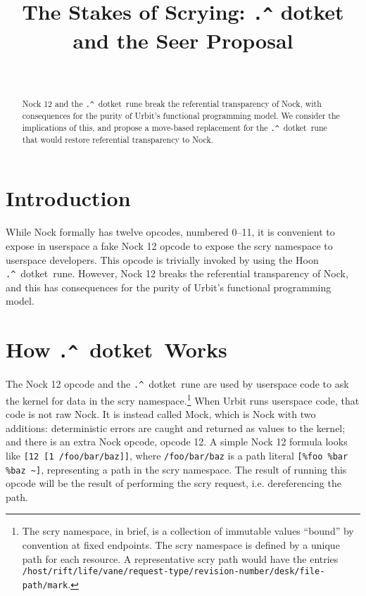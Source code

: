 \documentclass[twoside]{article}
\title{The Stakes of Scrying:  \lstinline[style=inlinecode]{.^} dotket and the Seer Proposal}
\author{\authorname~\authorpatp \\ \affiliation}
\date{}
\newcommand{\dotket}{\lstinline[style=inlinecode]{.^}~dotket}
\begin{document}
\maketitle
\thispagestyle{firststyle}

\begin{abstract}
Nock 12 and the \dotket~rune break the referential transparency of Nock, with consequences for the purity of Urbit's functional programming model.  We consider the implications of this, and propose a move-based replacement for the \dotket~rune that would restore referential transparency to Nock.
\end{abstract}

\setcounter{page}{1}

\tableofcontents

\section{Introduction}

While Nock formally has twelve opcodes, numbered 0--11, it is convenient to expose in userspace a fake Nock 12 opcode to expose the scry namespace to userspace developers.  This opcode is trivially invoked by using the Hoon \dotket~rune.  However, Nock 12 breaks the referential transparency of Nock, and this has consequences for the purity of Urbit's functional programming model.

\section[How dotket Works]{How \dotket~Works}

The Nock 12 opcode and the \dotket~rune are used by userspace code to ask the kernel for data in the scry namespace.\footnote{The scry namespace, in brief, is a collection of immutable values “bound” by convention at fixed endpoints.  The scry namespace is defined by a unique path for each resource.  A representative scry path would have the entries \lstinline[style=inlinecode]{/host/rift/life/vane/request-type/revision-number/desk/file-path/mark}.}  When Urbit runs userspace code, that code is not raw Nock.  It is instead called Mock, which is Nock with two additions:   deterministic errors are caught and returned as values to the kernel; and there is an extra Nock opcode, opcode 12.  A simple Nock 12 formula looks like \lstinline[style=inlinecode]{[12 [1 /foo/bar/baz]]}, where \lstinline[style=inlinecode]{/foo/bar/baz} is a path literal \lstinline[style=inlinecode]{[%foo %bar %baz ~]}, representing a path in the scry namespace.  The result of running this opcode will be the result of performing the scry request, i.e. dereferencing the path.
\end{document}
